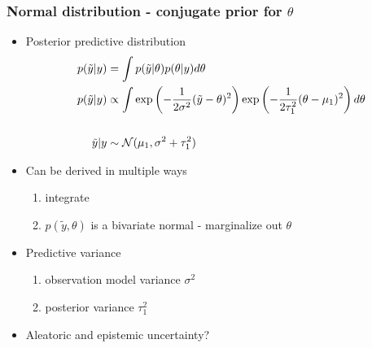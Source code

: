 \documentclass[10pt]{beamer}
\begin{document}
\begin{frame}
  \frametitle{Normal distribution - conjugate prior for $\theta$}
  \begin{itemize}
  \item Posterior predictive distribution
    \begin{align*}
      p(\tilde{y}|y)&=\int p(\tilde{y}|\theta)p(\theta|y) d\theta \\
      p(\tilde{y}|y)& \propto \int
      \exp\left(-\frac{1}{2\sigma^2}(\tilde{y}-\theta)^2\right)\exp\left(-\frac{1}{2\tau_1^2}(\theta-\mu_1)^2\right) d\theta \\
      ~&~\\
      \tilde{y}|y &\sim \mathcal{N}(\mu_1,\sigma^2+\tau_1^2)
    \end{align*}
  \pause
  \item Can be derived in multiple ways
  \begin{enumerate}
    \item integrate
    \item $p(\tilde{y},\theta)$ is a bivariate normal - marginalize out $\theta$
  \end{enumerate}
  \item Predictive variance
  \begin{enumerate}
    \item observation model variance $\sigma^2$
    \item posterior variance $\tau_1^2$
  \end{enumerate}
  \pause
  \item {\color{uured}Aleatoric} and {\color{uured}epistemic} uncertainty?
  \end{itemize}
\end{frame}
\end{document}

